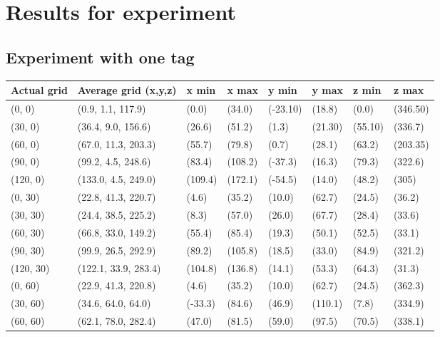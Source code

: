 \section{Results for experiment}
\label{sec:experiment}

\subsection{Experiment with one tag}
\label{app:one-tag}
\begin{table}[H]
    \begin{tabular}{|l|l|l|l|l|l|l|l|}
    \hline
    Actual grid & Average grid (x,y,z)  & x min   & x max   & y min    & y max   & z min   & z max    \\ \hline
    (0, 0)      & (0.9, 1.1, 117.9)     & (0.0)   & (34.0)  & (-23.10) & (18.8)  & (0.0)   & (346.50) \\ \hline
    (30, 0)     & (36.4, 9.0, 156.6)    & (26.6)  & (51.2)  & (1.3)    & (21.30) & (55.10) & (336.7)  \\ \hline
    (60, 0)     & (67.0, 11.3, 203.3)   & (55.7)  & (79.8)  & (0.7)    & (28.1)  & (63.2)  & (203.35) \\ \hline
    (90, 0)     & (99.2, 4.5, 248.6)    & (83.4)  & (108.2) & (-37.3)  & (16.3)  & (79.3)  & (322.6)  \\ \hline
    (120, 0)    & (133.0, 4.5, 249.0)   & (109.4) & (172.1) & (-54.5)  & (14.0)  & (48.2)  & (305)    \\ \hline
    (0, 30)     & (22.8, 41.3, 220.7)   & (4.6)   & (35.2)  & (10.0)   & (62.7)  & (24.5)  & (36.2)   \\ \hline
    (30, 30)    & (24.4, 38.5, 225.2)   & (8.3)   & (57.0)  & (26.0)   & (67.7)  & (28.4)  & (33.6)   \\ \hline
    (60, 30)    & (66.8, 33.0, 149.2)   & (55.4)  & (85.4)  & (19.3)   & (50.1)  & (52.5)  & (33.1)   \\ \hline
    (90, 30)    & (99.9, 26.5, 292.9)   & (89.2)  & (105.8) & (18.5)   & (33.0)  & (84.9)  & (321.2)  \\ \hline
    (120, 30)   & (122.1, 33.9, 283.4)  & (104.8) & (136.8) & (14.1)   & (53.3)  & (64.3)  & (31.3)   \\ \hline
    (0, 60)     & (22.9, 41.3, 220.8)   & (4.6)   & (35.2)  & (10.0)   & (62.7)  & (24.5)  & (362.3)  \\ \hline
    (30, 60)    & (34.6, 64.0, 64.0)    & (-33.3) & (84.6)  & (46.9)   & (110.1) & (7.8)   & (334.9)  \\ \hline
    (60, 60)    & (62.1, 78.0, 282.4)   & (47.0)  & (81.5)  & (59.0)   & (97.5)  & (70.5)  & (338.1)  \\ \hline

\end{tabular}
\end{table}
